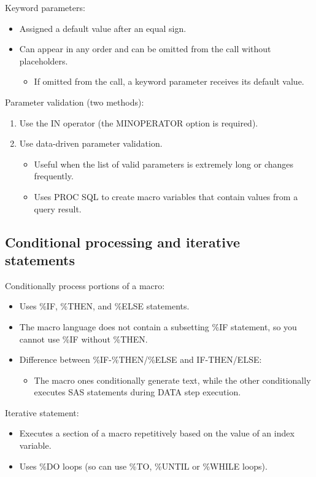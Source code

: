 \documentclass[11pt, oneside]{article}
\begin{document}
Keyword parameters:
\begin{itemize}
\item Assigned a default value after an equal sign.
\item Can appear in any order and can be omitted from the call without placeholders.
	\begin{itemize}
	\item If omitted from the call, a keyword parameter receives its default value.
	\end{itemize}
\end{itemize}


Parameter validation (two methods):
\begin{enumerate}
\item Use the IN operator (the MINOPERATOR option is required).
\item Use data-driven parameter validation.
	\begin{itemize}
	\item Useful when the list of valid parameters is extremely long or changes frequently.
	\item Uses PROC SQL to create macro variables that contain values from a query result.
	\end{itemize}
\end{enumerate}


\subsection{Conditional processing and iterative statements}

Conditionally process portions of a macro:
\begin{itemize}
\item Uses \%IF, \%THEN, and \%ELSE statements.
\item The macro language does not contain a subsetting \%IF statement, so you cannot use \%IF without \%THEN.
\item Difference between  \%IF-\%THEN/\%ELSE and IF-THEN/ELSE:
	\begin{itemize}
	\item The macro ones conditionally generate text, while the other conditionally executes SAS statements during DATA step execution.
	\end{itemize}
\end{itemize}

Iterative statement:
\begin{itemize}
\item Executes a section of a macro repetitively based on the value of an index variable. 
\item Uses \%DO loops (so can use \%TO, \%UNTIL or \%WHILE loops).
\end{itemize}
\end{document}
